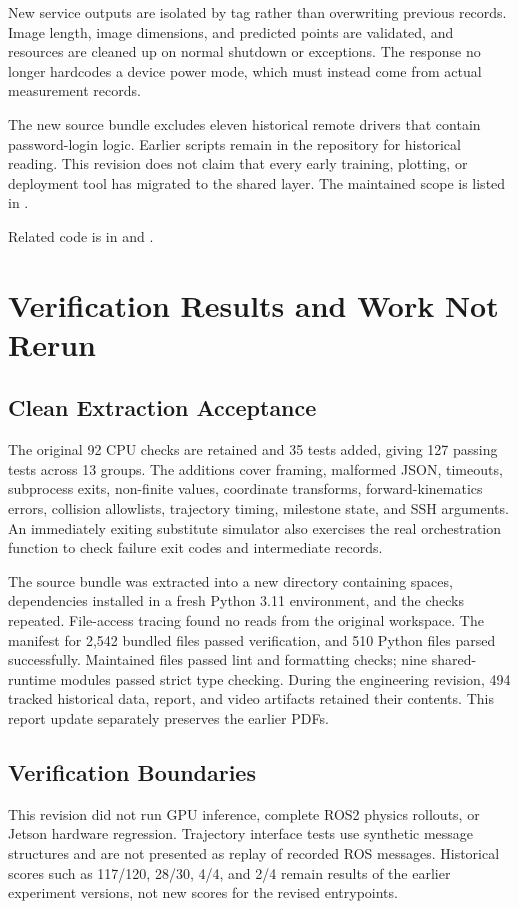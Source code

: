 New service outputs are isolated by tag rather than overwriting previous records. Image length, image dimensions, and predicted points are validated, and resources are cleaned up on normal shutdown or exceptions. The response no longer hardcodes a device power mode, which must instead come from actual measurement records.

The new source bundle excludes eleven historical remote drivers that contain password-login logic. Earlier scripts remain in the repository for historical reading. This revision does not claim that every early training, plotting, or deployment tool has migrated to the shared layer. The maintained scope is listed in .

Related code is in  and .

\section{Verification Results and Work Not Rerun}
\subsection{Clean Extraction Acceptance}
The original 92 CPU checks are retained and 35 tests added, giving 127 passing tests across 13 groups. The additions cover framing, malformed JSON, timeouts, subprocess exits, non-finite values, coordinate transforms, forward-kinematics errors, collision allowlists, trajectory timing, milestone state, and SSH arguments. An immediately exiting substitute simulator also exercises the real orchestration function to check failure exit codes and intermediate records.

The source bundle was extracted into a new directory containing spaces, dependencies installed in a fresh Python 3.11 environment, and the checks repeated. File-access tracing found no reads from the original workspace. The manifest for 2,542 bundled files passed verification, and 510 Python files parsed successfully. Maintained files passed lint and formatting checks; nine shared-runtime modules passed strict type checking. During the engineering revision, 494 tracked historical data, report, and video artifacts retained their contents. This report update separately preserves the earlier PDFs.

\subsection{Verification Boundaries}
This revision did not run GPU inference, complete ROS2 physics rollouts, or Jetson hardware regression. Trajectory interface tests use synthetic message structures and are not presented as replay of recorded ROS messages. Historical scores such as 117/120, 28/30, 4/4, and 2/4 remain results of the earlier experiment versions, not new scores for the revised entrypoints.

